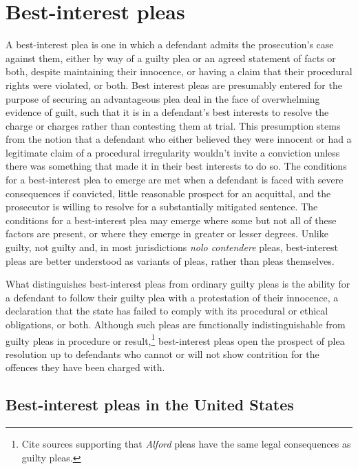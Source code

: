 \section{Best-interest pleas}

A best-interest plea is one in which a defendant admits the prosecution’s case against them, either by way of a guilty plea or an agreed statement of facts or both, despite maintaining their innocence, or having a claim that their procedural rights were violated, or both. Best interest pleas are presumably entered for the purpose of securing an advantageous plea deal in the face of overwhelming evidence of guilt, such that it is in a defendant’s best interests to resolve the charge or charges rather than contesting them at trial. This presumption stems from the notion that a defendant who either believed they were innocent or had a legitimate claim of a procedural irregularity wouldn't invite a conviction unless there was something that made it in their best interests to do so. The conditions for a best-interest plea to emerge are met when a defendant is faced with severe consequences if convicted, little reasonable prospect for an acquittal, and the prosecutor is willing to resolve for a substantially mitigated sentence. The conditions for a best-interest plea may emerge where some but not all of these factors are present, or where they emerge in greater or lesser degrees. Unlike guilty, not guilty and, in most jurisdictions \textit{nolo contendere} pleas, best-interest pleas are better understood as variants of pleas, rather than pleas themselves.

What distinguishes best-interest pleas from ordinary guilty pleas is the ability for a defendant to follow their guilty plea with a protestation of their innocence, a declaration that the state has failed to comply with its procedural or ethical obligations, or both. Although such pleas are functionally indistinguishable from guilty pleas in procedure or result,\footnote{Cite sources supporting that \textit{Alford} pleas have the same legal consequences as guilty pleas.} best-interest pleas open the prospect of plea resolution up to defendants who cannot or will not show contrition for the offences they have been charged with.

\subsection{Best-interest pleas in the United States}

